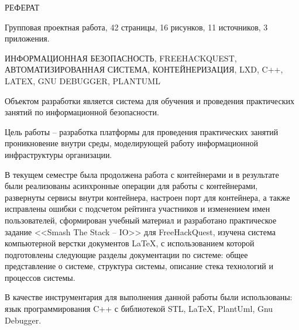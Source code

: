 \begin{center}
РЕФЕРАТ
\end{center}
\vspace{\baselineskip}

Групповая проектная работа, 42 страницы, 16 рисунков, 11 источников, 3 приложения.\par
ИНФОРМАЦИОННАЯ БЕЗОПАСНОСТЬ, FREEHACKQUEST, АВТОМАТИЗИРОВАННАЯ СИСТЕМА, КОНТЕЙНЕРИЗАЦИЯ, LXD, C++, LATEX, GNU DEBUGGER, PLANTUML\par
Объектом разработки является система для обучения и проведения практических занятий по информационной безопасности.\par
Цель работы -- разработка платформы для проведения практических занятий\hfil\\проникновение внутри среды, моделирующей работу информационной инфраструктуры организации.\par
В текущем семестре была продолжена работа с контейнерами и в результате были реализованы асинхронные операции для работы с контейнерами, развернуты сервисы внутри контейнера, настроен порт для контейнера, а также исправлены ошибки с подсчетом рейтинга участников и изменением имен пользователей, сформирован учебный материал и разработано практическое задание <<Smash The Stack -- IO>> для FreeHackQuest, изучена система компьютерной верстки документов \LaTeX, с использованием которой подготовлены следующие разделы документации по системе: общее представление о системе, структура системы, описание стека технологий и процессов системы.\par
В качестве инструментария для выполнения данной работы были использованы: язык программирования C++ с библиотекой STL, \LaTeX, PlantUml, Gnu Debugger.\par
\clearpage
